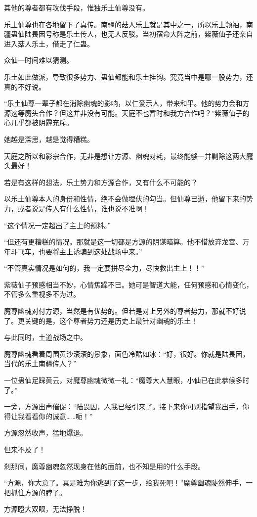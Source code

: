 \begin{this_body}
其他的尊者都有攻伐手段，惟独乐土仙尊没有。

乐土仙尊也在各地留下了真传。南疆的菇人乐土就是其中之一，所以乐土领袖，南疆蛊仙陆畏因号称是乐土传人，也无人反驳。当初宿命大阵之前，紫薇仙子还亲自进入菇人乐土，借走了仁蛊。

众仙一时间难以猜测。

乐土如此做派，导致很多势力、蛊仙都能和乐土挂钩。究竟当中是哪一股势力，还真的不好说。

“乐土仙尊一辈子都在消除幽魂的影响，以仁爱示人，带来和平。他的势力会和方源这等魔头合作？但这并非没有可能。天庭不也暂时和我方合作吗？”紫薇仙子的心几乎都被阴霾充斥。

她越是深思，越是觉得糟糕。

天庭之所以和影宗合作，无非是想让方源、幽魂对耗，最终能够一并剿除这两大魔头最好！

若是有这样的想法，乐土势力和方源合作，又有什么不可能的？

以乐土仙尊本人的身份和性情，绝不会做埋伏的勾当。但仙尊已逝，他留下来的势力，或者说是传人有什么性情，谁也说不准啊！

“这个情况一定超出了主上的预料。”

“但还有更糟糕的情况。那就是这一切都是方源的阴谋暗算。他不惜放弃龙宫、万年斗飞车，也要将主上诱骗到这处战场中来。”

“不管真实情况是如何的，我一定要拼尽全力，尽快救出主上！！”

紫薇仙子预感相当不妙，心情焦躁不已。她可是智道大能，任何预感和心情变化，不管多么重视多不为过。

魔尊幽魂对付方源，当然是有优势的。但若是对上另外的尊者势力，那就不好说了。更关键的是，这个尊者势力还是历史上最针对幽魂的乐土！

与此同时，土道战场之中。

魔尊幽魂看着周围黄沙滚滚的景象，面色冷酷如冰：“好，很好。你就是陆畏因，当代的乐土南疆传人？”

一位蛊仙足踩黄云，对魔尊幽魂微微一礼：“魔尊大人慧眼，小仙已在此恭候多时了。”

一旁，方源出声催促：“陆畏因，人我已经引来了。接下来你可别指望我出手，你得让我看看你的诚意……呃！”

方源忽然收声，猛地爆退。

但来不及了！

刹那间，魔尊幽魂忽然现身在他的面前，也不知是用的什么手段。

“方源，你大意了。真是难为你逃到了这一步，给我死吧！”魔尊幽魂陡然伸手，一把抓住方源的脖子。

方源瞪大双眼，无法挣脱！

\end{this_body}

